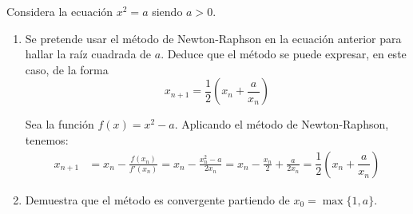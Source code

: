 \begin{ejercicio}
    Considera la ecuación $x^2 = a$ siendo $a > 0$.
    \begin{enumerate}
        \item Se pretende usar el método de Newton-Raphson en la ecuación anterior para hallar la raíz cuadrada de $a$. Deduce que el método se puede expresar, en este caso, de la forma
        \[
            x_{n+1} = \frac{1}{2}\left(x_n + \frac{a}{x_n}\right)
        \]

        Sea la función $f(x) = x^2 - a$. Aplicando el método de Newton-Raphson, tenemos:
        \begin{align*}
            x_{n+1} &= x_n - \frac{f(x_n)}{f'(x_n)} = x_n - \frac{x_n^2 - a}{2x_n} = x_n - \frac{x_n}{2} + \frac{a}{2x_n} = \dfrac{1}{2}\left(x_n + \dfrac{a}{x_n}\right)
        \end{align*}
        \item Demuestra que el método es convergente partiendo de $x_0 = \max\{1, a\}$.
        \begin{comment}
        Emplearemos el intervalo $\left[0,a+1\right]$. Calculamos la derivada de $f$:
        \begin{align*}
            f'(x) = 2x\qquad \forall x\in \bb{R}
        \end{align*}

        Además, usaremos el siguiente resultado:
        \begin{equation*}
            (a+1)^2>a \iff a^2 + 2a + 1 > a \iff a^2 + a + 1 > 0
        \end{equation*}
        que es cierto, pues $a > 0$. Demostramos ahora los 4 puntos necesarios para el Teorema de Convergencia del Método de Newton-Raphson:
        \begin{enumerate}
            \item $f(0)f(a+1) < 0$:
            \begin{align*}
                f(0) = -a < 0\\
                f(a+1) = (a+1)^2 - a > 0
            \end{align*}


\end{comment}
\end{enumerate}
\end{ejercicio}
